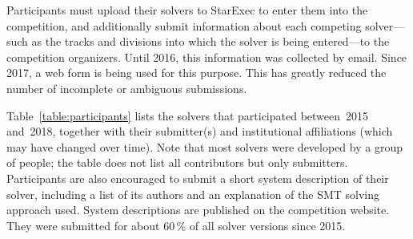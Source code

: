\documentclass[twoside,11pt]{article}
\begin{document}
Participants must upload their solvers to StarExec to enter them into
the competition, and additionally submit information about each
competing solver---such as the tracks and divisions into which the
solver is being entered---to the competition organizers.  Until 2016,
this information was collected by email.  Since 2017, a web form is
being used for this purpose.  This has greatly reduced the number of
incomplete or ambiguous submissions.

Table~\ref{table:participants} lists the solvers that participated
between~2015 and~2018, together with their submitter(s) and
institutional affiliations (which may have changed over time).  Note
that most solvers were developed by a group of people; the table does
not list all contributors but only submitters.
%
Participants are also encouraged to submit a short system description
of their solver, including a list of its authors and an explanation of
the SMT solving approach used.  System descriptions are published on
the competition website.  They were submitted for about 60\,\% of all
solver versions since 2015.
\end{document}

